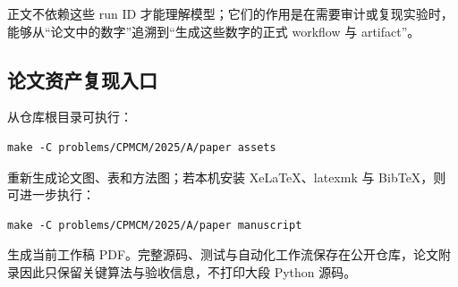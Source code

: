 正文不依赖这些 run ID 才能理解模型；它们的作用是在需要审计或复现实验时，能够从“论文中的数字”追溯到“生成这些数字的正式 workflow 与 artifact”。

\subsection{论文资产复现入口}

从仓库根目录可执行：
\begin{verbatim}
make -C problems/CPMCM/2025/A/paper assets
\end{verbatim}
重新生成论文图、表和方法图；若本机安装 XeLaTeX、latexmk 与 BibTeX，则可进一步执行：
\begin{verbatim}
make -C problems/CPMCM/2025/A/paper manuscript
\end{verbatim}
生成当前工作稿 PDF。完整源码、测试与自动化工作流保存在公开仓库，论文附录因此只保留关键算法与验收信息，不打印大段 Python 源码。
